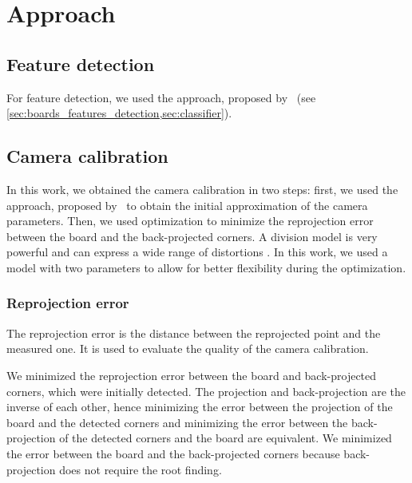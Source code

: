 \chapter{Approach}\label{cha:approach}

\section{Feature detection}\label{sec:feature_detection}

For feature detection, we used the approach, proposed
by~\cite{geigerAutomaticCameraRange2012} (see
\cref{sec:boards_features_detection,sec:classifier}).

\section{Camera calibration}\label{sec:camera_calibration}

In this work, we obtained the camera calibration in two steps: first, we
used the approach, proposed by~\cite{scaramuzzaToolboxEasilyCalibrating2006} to
obtain the initial approximation of the camera parameters. Then, we used
optimization to minimize the reprojection error between the board and the
back-projected corners. A division model is very powerful and can
express a wide range of distortions
\citep{prittsMinimalSolversRectifying2021}. In this work, we used a model with
two parameters to allow for better flexibility during the optimization.

\subsection{Reprojection error}\label{sub:reprojection_error}

The reprojection error is the distance between the reprojected point and the
measured one. It is used to evaluate the quality of the camera calibration.

We minimized the reprojection error between the board and back-projected
corners, which were initially detected. The projection and back-projection are
the inverse of each other, hence minimizing the error between the projection of
the board and the detected corners and minimizing the error between the
back-projection of the detected corners and the board are
equivalent. We minimized the error
between the board and the back-projected corners because back-projection does
not require the root finding.

